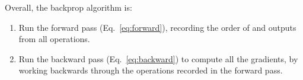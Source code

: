 \documentclass{article}
\newcommand{\dt}[2][]{\frac{d #1}{d #2}}
\newcommand{\dL}{\dt[\L]}
\newcommand{\bracket}[3]{\left#1 #3 \right#2}
\renewcommand{\b}{\bracket{(}{)}}
\newcommand{\x}{\mathbf{x}}
\newcommand{\y}{\mathbf{y}}
\newcommand{\f}{\mathbf{f}}
\newcommand{\h}{\mathbf{h}}
\newcommand{\bv}{\mathbf{b}}
\renewcommand{\a}{\mathbf{a}}
\newcommand{\W}{\mathbf{W}}
\renewcommand{\L}{\mathcal{L}}
\newcommand{\sqerr}{\operatorname{sqerr}}
\newcommand{\funcback}{\operatorname{func{.}backward}}
\newcommand{\inputs}{\operatorname{inputs}}
\newcommand{\outputs}{\operatorname{outputs}}
\newcommand{\linearback}{\operatorname{linear{.}backward}}
\newcommand{\reluback}{\operatorname{relu{.}backward}}
\newcommand{\sqerrback}{\operatorname{sqerr{.}backward}}
\begin{document}
%

Overall, the backprop algorithm is:
\begin{enumerate}
  \item Run the forward pass (Eq.~\ref{eq:forward}), recording the order of and outputs from all operations.
  \item Run the backward pass (Eq.~\ref{eq:backward}) to compute all the gradients, by working backwards through the operations recorded in the forward pass.
\end{enumerate}
\end{document}
